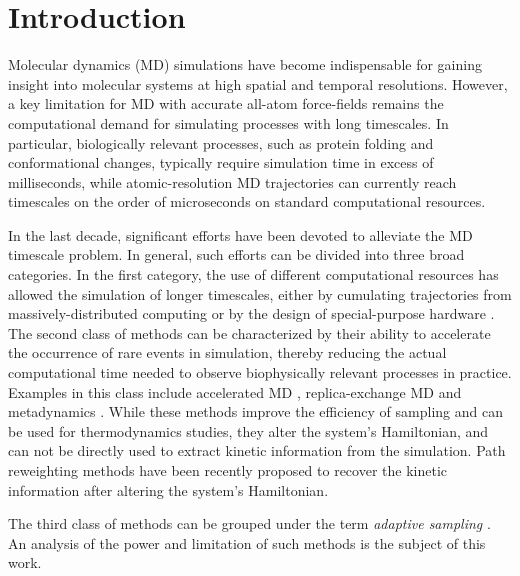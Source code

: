\section{\label{sec:intro2}Introduction}

Molecular dynamics (MD) simulations have become indispensable for gaining
insight into molecular systems at high spatial and temporal resolutions.
However, a key limitation for MD with accurate all-atom force-fields remains
the computational demand for simulating processes with long timescales. In
particular, biologically relevant processes, such as protein folding and
conformational changes, typically require simulation time in excess of
milliseconds, while atomic-resolution MD trajectories can currently reach
timescales on the order of microseconds on standard computational resources. 

In the last decade, significant efforts have been devoted to alleviate the MD
timescale problem.
In general, such efforts can be divided into three broad categories. In the
first category, the use of different computational resources has allowed the
simulation of longer timescales, either by cumulating trajectories from
massively-distributed computing \cite{DistComp-Shirts2000, DistComp-Buch2010}
or by the design of special-purpose hardware \cite{shaw2014anton}.
The second class of methods can be characterized by their ability to
accelerate the occurrence of rare events in simulation, thereby reducing the 
actual computational time needed to observe biophysically relevant
processes in practice. Examples in this class include accelerated MD
\cite{hamelberg2004accelerated}, replica-exchange MD \cite{sugita1999replica}
and metadynamics \cite{laio2008metadynamics}. While these methods improve the
efficiency of sampling and can be used for thermodynamics studies, they 
alter the system's Hamiltonian, and can not be directly used to extract kinetic
information from the simulation. Path reweighting
methods \cite{pathreweight1, pathreweight2, pathreweight3, pathreweight4}
have been recently proposed to recover the kinetic information
after altering the system's Hamiltonian.

The third class of methods can be grouped under the term \emph{adaptive
sampling} \cite{singhal2005error, bowman2010enhanced,
weber2011characterization, Fabritiis-2014, preto2014fast, doerr2016htmd,
AdaptivePELE-Lecina2017, EvolutionCoupling-Shamsi2017, FAST-Bowman-2015, 
Strategies-erros-reduce, plattner2017complete}. An analysis of the power and
limitation of such methods is the subject of this work. 

